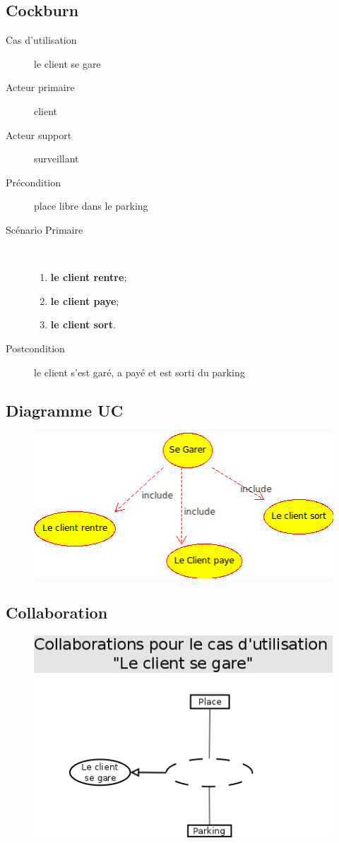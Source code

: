 \documentclass[a4paper]{article}
\begin{document}
\subsection{Cockburn}
\begin{description}
	\item[Cas d'utilisation] le client se gare
	\item[Acteur primaire] client
	\item[Acteur support] surveillant
	\item[Pr\'econdition] place libre dans le parking
	\item[Sc\'enario Primaire] \
	\begin{enumerate}
		\item \textbf{le client rentre};
		\item \textbf{le client paye};
		\item \textbf{le client sort}.
	\end{enumerate}
	\item[Postcondition] le client s'est gar\'e, a pay\'e et est sorti du parking
\end{description}

\subsection{Diagramme UC}
\begin{figure}[!ht]
\centering
\includegraphics[scale=.7]{se_garer.png}
\end{figure}

\subsection{Collaboration}
\begin{figure}[!ht]
\centering
\includegraphics[scale=.5]{collaborations/_gare.png}
\end{figure}
\end{document}
